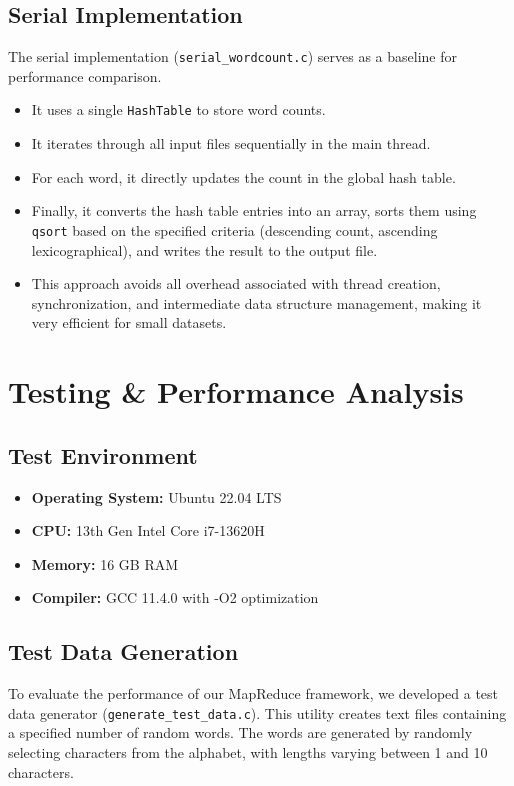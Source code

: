 \documentclass[a4paper,12pt]{article}
\begin{document}
\subsection{Serial Implementation}
The serial implementation (\texttt{serial\_wordcount.c}) serves as a baseline for performance comparison.
\begin{itemize}
    \item It uses a single \texttt{HashTable} to store word counts.
    \item It iterates through all input files sequentially in the main thread.
    \item For each word, it directly updates the count in the global hash table.
    \item Finally, it converts the hash table entries into an array, sorts them using \texttt{qsort} based on the specified criteria (descending count, ascending lexicographical), and writes the result to the output file.
    \item This approach avoids all overhead associated with thread creation, synchronization, and intermediate data structure management, making it very efficient for small datasets.
\end{itemize}

\section{Testing \& Performance Analysis}

\subsection{Test Environment}
\begin{itemize}
    \item \textbf{Operating System:} Ubuntu 22.04 LTS
    \item \textbf{CPU:} 13th Gen Intel Core i7-13620H
    \item \textbf{Memory:} 16 GB RAM
    \item \textbf{Compiler:} GCC 11.4.0 with -O2 optimization
\end{itemize}

\subsection{Test Data Generation}
To evaluate the performance of our MapReduce framework, we developed a test data generator (\texttt{generate\_test\_data.c}). This utility creates text files containing a specified number of random words. The words are generated by randomly selecting characters from the alphabet, with lengths varying between 1 and 10 characters.
\end{document}
